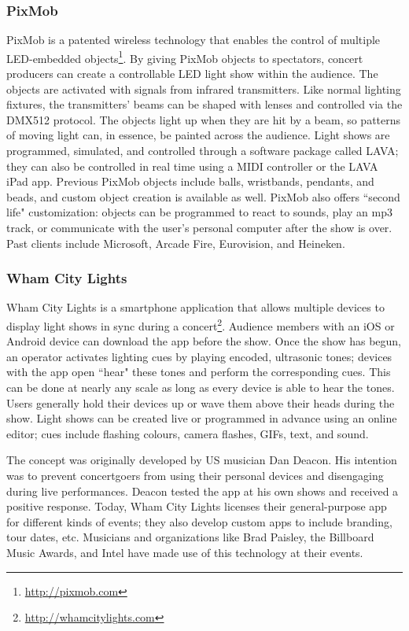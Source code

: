 \subsubsection{PixMob}

PixMob is a patented wireless technology that enables the control of multiple LED-embedded objects\footnote{\url{http://pixmob.com}}. By giving PixMob objects to spectators, concert producers can create a controllable LED light show within the audience. The objects are activated with signals from infrared transmitters. Like normal lighting fixtures, the transmitters' beams can be shaped with lenses and controlled via the DMX512 protocol. The objects light up when they are hit by a beam, so patterns of moving light can, in essence, be painted across the audience. Light shows are programmed, simulated, and controlled through a software package called LAVA; they can also be controlled in real time using a MIDI controller or the LAVA iPad app. Previous PixMob objects include balls, wristbands, pendants, and beads, and custom object creation is available as well. PixMob also offers ``second life" customization: objects can be programmed to react to sounds, play an mp3 track, or communicate with the user's personal computer after the show is over. Past clients include Microsoft, Arcade Fire, Eurovision, and Heineken.

\subsubsection{Wham City Lights}

Wham City Lights is a smartphone application that allows multiple devices to display light shows in sync during a concert\footnote{\url{http://whamcitylights.com}}. Audience members with an iOS or Android device can download the app before the show. Once the show has begun, an operator activates lighting cues by playing encoded, ultrasonic tones; devices with the app open ``hear" these tones and perform the corresponding cues. This can be done at nearly any scale as long as every device is able to hear the tones. Users generally hold their devices up or wave them above their heads during the show. Light shows can be created live or programmed in advance using an online editor; cues include flashing colours, camera flashes, GIFs, text, and sound.

The concept was originally developed by US musician Dan Deacon. His intention was to prevent concertgoers from using their personal devices and disengaging during live performances. Deacon tested the app at his own shows and received a positive response. Today, Wham City Lights licenses their general-purpose app for different kinds of events; they also develop custom apps to include branding, tour dates, etc. Musicians and organizations like Brad Paisley, the Billboard Music Awards, and Intel have made use of this technology at their events.

